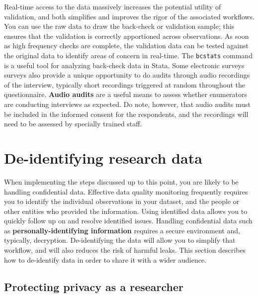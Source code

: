 Real-time access to the data massively increases the potential utility of validation,
and both simplifies and improves the rigor of the associated workflows.
You can use the raw data to draw the back-check or validation sample;
this ensures that the validation is correctly apportioned across observations.
As soon as high frequency checks are complete,
the validation data can be tested against
the original data to identify areas of concern in real-time.
The \texttt{bcstats} command is a useful tool for analyzing back-check data in Stata.
Some electronic surveys surveys also provide a unique opportunity
to do audits through audio recordings of the interview,
typically short recordings triggered at random throughout the questionnaire.
\textbf{Audio audits} are a useful means to
assess whether enumerators are conducting interviews as expected.
Do note, however, that audio audits must be included in the informed consent for the respondents,
and the recordings will need to be assessed by specially trained staff.


\section{De-identifying research data}

When implementing the steps discussed up to this point,
you are likely to be handling confidential data.
Effective data quality monitoring
frequently requires you to identify the individual observations in your dataset,
and the people or other entities who provided the information.
Using identified data allows you to quickly follow up on and resolve identified issues.
Handling confidential data such as
\textbf{personally-identifying information}
requires a secure environment and, typically, decryption.
De-identifying the data will allow you to simplify that workflow,
and will also reduces the risk of harmful leaks.
This section describes how to de-identify data in order to share it with a wider audience.

\subsection{Protecting privacy as a researcher}

